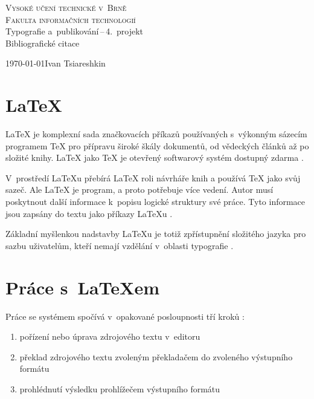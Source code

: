 \documentclass[a4paper, 11pt]{article}
\begin{document}
\begin{titlepage}
    \begin{center}
        \textsc{\Huge {Vysoké učení technické v~Brně} \\ [0.4em]}
        \textsc{\huge {Fakulta informačních technologií}} \\
        {\LARGE Typografie a~publikování\,--\,4.~projekt} \\
        \Huge{Bibliografické citace}
    \end{center}
    \Large{\today \hfill Ivan Tsiareshkin} 
\end{titlepage}

\newpage

\section{\LaTeX}
    {\LaTeX} je komplexní sada značkovacích příkazů používaných s~výkonným sázecím programem {\TeX} pro přípravu široké škály dokumentů, od vědeckých článků až po složité knihy. {\LaTeX} jako {\TeX} je otevřený softwarový systém dostupný zdarma \cite{Guide2003}.

    \noindent V~prostředí {\LaTeX}u přebírá {\LaTeX} roli návrháře knih a používá {\TeX} jako svůj sazeč. Ale {\LaTeX} je  program, a proto potřebuje více vedení. Autor musí poskytnout další informace k~popisu logické struktury své práce. Tyto informace jsou zapsány do textu jako příkazy {\LaTeX}u \cite{Oetiker2018}. 

    \noindent Základní myšlenkou nadstavby \LaTeX u je totiž zpřístupnění složitého jazyka pro sazbu uživatelům, kteří nemají vzdělání v~oblasti typografie \cite{Pysny2009}.

\section{Práce s~{\LaTeX}em}
    Práce se systémem spočívá v~opakované posloupnosti tří kroků \cite{Rybicka2003}:
    \begin{enumerate}
        \item pořízení nebo úprava zdrojového textu v~editoru
        \item překlad zdrojového textu zvoleným překladačem do zvoleného výstupního formátu
        \item prohlédnutí výsledku prohlížečem výstupního formátu
    \end{enumerate}
\end{document}
